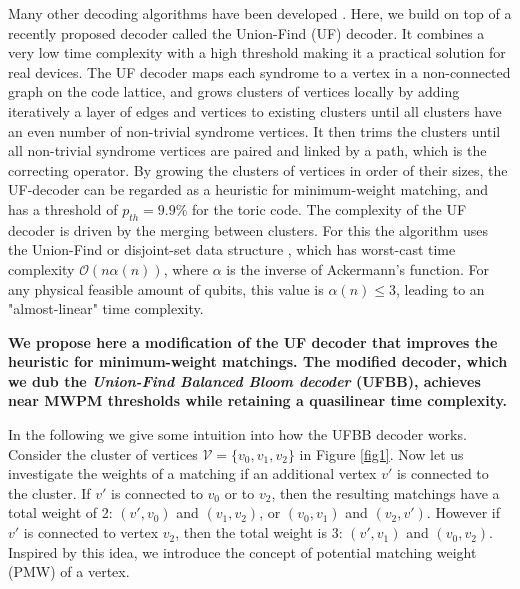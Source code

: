 \documentclass[11pt, a4paper, twoside, titlepage ,dvipsnames]{report}
\begin{document}
Many other decoding algorithms have been developed \cites{fowler2013minimum, duclos2013fault, hutter2015improved, watson2015fast, tuckett2018ultrahigh, kubica2019cellular, torlai2017neural, varsamopoulos2017decoding}. Here, we build on top of a recently proposed decoder called the Union-Find (UF) decoder. It combines a very low time complexity with a high threshold \cite{delfosse2017linear, delfosse2017almost} making it a practical solution for real devices. 
The UF decoder maps each syndrome to a vertex in a non-connected graph on the code lattice, and grows clusters of vertices locally by adding iteratively a layer of edges and vertices to existing clusters until 
all clusters have an even number of non-trivial syndrome vertices. It then trims the clusters until all non-trivial syndrome vertices are paired and linked by a path, which is the correcting operator. 
By growing the clusters of vertices in order of their sizes, the UF-decoder can be regarded as a heuristic for minimum-weight matching, and has a threshold of $p_{th} = 9.9\%$ for the toric code. 
The complexity of the UF decoder is driven by the merging between clusters. For this the algorithm uses the Union-Find or disjoint-set data structure \cite{tarjan1975efficiency}, which has worst-cast time complexity $\mathcal{O}(n\alpha(n))$, where $\alpha$ is the inverse of Ackermann's function. For any physical feasible amount of qubits, this value is $\alpha(n) \leq 3$, leading to an "almost-linear" time complexity.

\textbf{We propose here a modification of the UF decoder that improves the heuristic for minimum-weight matchings. The modified decoder, which we dub the \emph{Union-Find Balanced Bloom decoder} (UFBB), achieves near MWPM thresholds while retaining a quasilinear time complexity.}

In the following we give some intuition into how the UFBB decoder works. Consider the cluster of vertices $\mathcal{V}=\{v_0,v_1,v_2\}$ in Figure \ref{fig1}. Now let us investigate the weights of a matching if an additional vertex $v'$ is connected to the cluster. 
If $v'$ is connected to $v_0$ or to $v_2$, then the resulting matchings have a total weight of 2: $(v',v_0)$ and $(v_1,v_2)$, or $(v_0,v_1)$ and $(v_2,v')$. However if $v'$ is connected to vertex $v_2$, then the total weight is 3: $(v', v_1)$ and $(v_0, v_2)$. Inspired by this idea, we introduce the concept of potential matching weight (PMW) of a vertex. 
\end{document}
